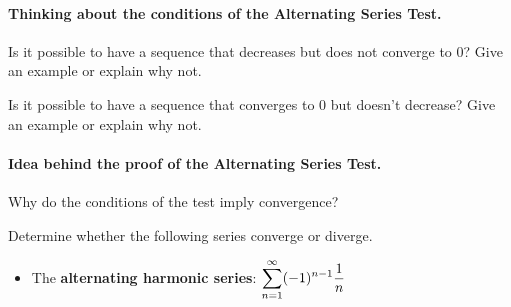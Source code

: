 \documentclass[12pt]{article}
\begin{document}
\vfill

\newpage


\vspace{4mm}


\vspace{5mm}

\paragraph{Thinking about the conditions of the Alternating Series Test.} Is it possible to have a sequence that decreases but does not converge to 0? Give an example or explain why not.

\vfill

Is it possible to have a sequence that converges to 0 but doesn't decrease? Give an example or explain why not.

\vfill

\newpage

\paragraph{Idea behind the proof of the Alternating Series Test.} Why do the conditions of the test imply convergence?

\vfill

\Examples Determine whether the following series converge or diverge.

\vspace{2mm}

\begin{itemize}
\item[\tc{1}] The \textbf{alternating harmonic series}: $\displaystyle\sum_{n=1}^\infty(-1)^{n-1}\dfrac{1}{n}$

\end{itemize}

\vfill

\newpage
\end{document}
